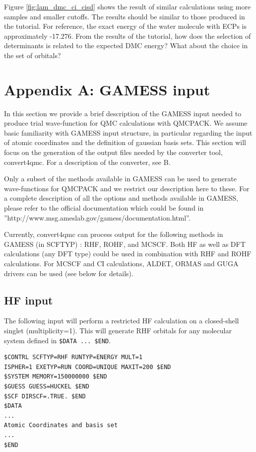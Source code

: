 Figure  \ref{fig:lam_dmc_ci_cisd} shows the result of similar calculations using more samples and smaller cutoffs.
The results should be similar to those produced in the tutorial. For reference, the exact
energy of the water molecule with ECPs is approximately -17.276. From the results of the
tutorial, how does the selection of determinants is related to the expected DMC energy?
What about the choice in the set of orbitals?


\newpage
\section{Appendix A: GAMESS input}
In this section we provide a brief description of the GAMESS input needed to produce
trial wave-function for QMC calculations with QMCPACK. We assume basic familiarity
with GAMESS input structure, in particular regarding the input of atomic coordinates and
the definition of gaussian basis sets. This section will focus on the generation of the output
files needed by the converter tool, convert4qmc. For a description of the converter, see B.

Only a subset of the methods available in GAMESS can be used to generate wave-functions 
for QMCPACK and we restrict our description here to these.
For a complete description of all the options and methods available
in GAMESS, please refer to the official documentation which could be found in
”http://www.msg.ameslab.gov/gamess/documentation.html”.

Currently, convert4qmc can process output for the following methods in GAMESS (in
SCFTYP) : RHF, ROHF, and MCSCF. Both HF as well as DFT calculations (any DFT
type) could be used in combination with RHF and ROHF calculations. For MCSCF and CI
calculations, ALDET, ORMAS and GUGA drivers can be used (see below for details).


\subsection{HF input}
The following input will perform a restricted HF calculation on a closed-shell singlet 
(multiplicity=1). This will generate RHF orbitals for any molecular system defined in 
\texttt{\$DATA ... \$END}.

\begin{lstlisting}
$CONTRL SCFTYP=RHF RUNTYP=ENERGY MULT=1
ISPHER=1 EXETYP=RUN COORD=UNIQUE MAXIT=200 $END
$SYSTEM MEMORY=150000000 $END
$GUESS GUESS=HUCKEL $END
$SCF DIRSCF=.TRUE. $END
$DATA
...
Atomic Coordinates and basis set
...
$END
\end{lstlisting}

